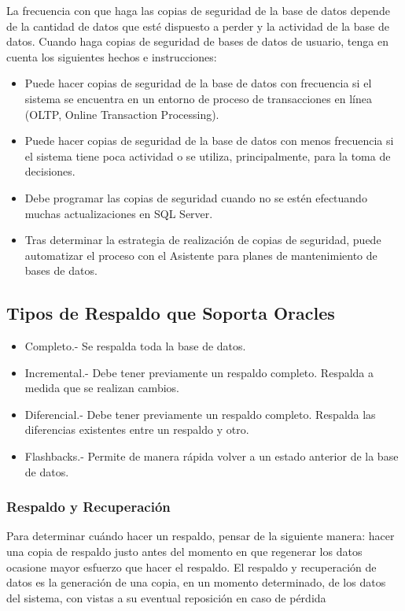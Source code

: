 \documentclass[a4paper,openright,12pt]{book}
\begin{document}
\begin{enumerate}[a)]
La frecuencia con que haga las copias de seguridad de la base de datos depende de la cantidad de datos que esté dispuesto a perder y la actividad de la base de datos. Cuando haga copias de seguridad de bases de datos de usuario, tenga en cuenta los siguientes hechos e instrucciones:
\begin{itemize}
\item Puede hacer copias de seguridad de la base de datos con frecuencia si el sistema se encuentra en un entorno de proceso de transacciones en línea (OLTP, Online Transaction Processing).
\item Puede hacer copias de seguridad de la base de datos con menos frecuencia si el sistema tiene poca actividad o se utiliza, principalmente, para la toma de decisiones.
\item Debe programar las copias de seguridad cuando no se estén efectuando muchas actualizaciones en SQL Server.
\item Tras determinar la estrategia de realización de copias de seguridad, puede automatizar el proceso con el Asistente para planes de mantenimiento de bases de datos.

\end{itemize}
\end{enumerate}
\subsection{Tipos de Respaldo que Soporta Oracles}

\begin{itemize}
\item Completo.- Se respalda toda la base de datos.
\item Incremental.- Debe tener previamente un respaldo completo. Respalda a medida que se realizan cambios.
\item Diferencial.- Debe tener previamente un respaldo completo. Respalda las diferencias existentes entre un respaldo y otro.
\item Flashbacks.- Permite de manera rápida volver a un estado anterior de la base de datos.

\end{itemize}


\subsubsection{Respaldo y Recuperación}
Para determinar cuándo hacer un respaldo, pensar de la siguiente manera: hacer una copia de respaldo justo antes del momento en que regenerar los datos ocasione mayor esfuerzo que hacer el respaldo.
El respaldo y recuperación de datos es la generación de una copia, en un momento determinado, de los datos del sistema, con vistas a su eventual reposición en caso de pérdida
\end{document}
